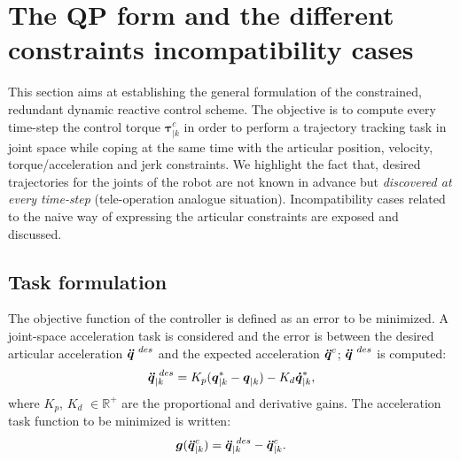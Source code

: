 \section[The QP form and the different constraints incompatibility cases]{The QP form and the different constraints incompatibility cases}
This section aims at establishing the general formulation of the constrained, redundant dynamic reactive control scheme. The objective is to compute every  time-step the control torque $\boldsymbol{\tau}_{|k}^{c}$ in order to perform a trajectory tracking task in joint space while coping at the same time with the articular position, velocity, torque/acceleration and jerk constraints. We highlight the fact that, desired trajectories for the joints of the robot are not known in advance but \textit{discovered at every time-step} (tele-operation analogue situation). Incompatibility cases related to the naive way of expressing the articular constraints are exposed and discussed. 
\subsection{Task formulation}
The objective function of the controller is defined as an error to be minimized. A joint-space acceleration task is considered and the error is between the desired articular acceleration $\mbox{\boldmath${\ddot{q}}$}^{~des}$ and the expected acceleration $\mbox{\boldmath${\ddot{q}}$}^{c}$; $\mbox{\boldmath${\ddot{q}}$}^{~des}$ is computed:
\begin{equation}
\mbox{\boldmath${\ddot{q}}$}_{|k}^{~des} = K_p (\mbox{\boldmath${q}$}_{|k}^{*}-\mbox{\boldmath${q}$}_{|k}) - K_d \mbox{\boldmath${\dot{q}}$}_{|k}^{*}, 
\label{qddot}
\end{equation}
where $K_p$, $K_d$ $\in \mathbb{R}^{+}$ are the proportional and derivative gains.
%
The acceleration task function to be minimized is written:
\begin{equation}
\mbox{\boldmath${g}$}(\mbox{\boldmath${\ddot{q}}$}_{|k}^{c}) = \mbox{\boldmath${\ddot{q}}$}_{|k}^{~des}-\mbox{\boldmath${\ddot{q}}$}_{|k}^c.
\label{artaccelerationError}
\end{equation}

